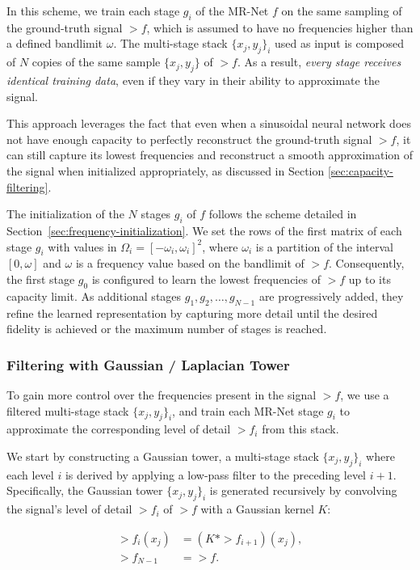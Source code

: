 In this scheme, we train each stage $g_i$ of the MR-Net $f$ on the same sampling of the ground-truth signal $\gt{f}$, which is assumed to have no frequencies higher than a defined bandlimit $\omega$. The multi-stage stack $\{x_j, y_j\}_i$ used as input is composed of $N$ copies of the same sample $\{x_j, y_j\}$ of $\gt{f}$. As a result, \textit{every stage receives identical training data}, even if they vary in their ability to approximate the signal.

This approach leverages the fact that even when a sinusoidal neural network does not have enough capacity to perfectly reconstruct the ground-truth signal $\gt{f}$, it can still capture its lowest frequencies and reconstruct a smooth approximation of the signal when initialized appropriately, as discussed in Section \ref{sec:capacity-filtering}. 

The initialization of the $N$ stages $g_i$ of $f$ follows the scheme detailed in Section~\ref{sec:frequency-initialization}. We set the rows of the first matrix of each stage $g_i$ with values in $\Omega_i=[-\omega_i, \omega_i]^2$, where $\omega_i$ is a partition of the interval $[0,\omega]$ and $\omega$ is a frequency value based on the bandlimit of $\gt{f}$. Consequently, the first stage $g_0$ is configured to learn the lowest frequencies of $\gt{f}$ up to its capacity limit. As additional stages $g_1, g_2, \ldots, g_{N-1}$ are progressively added, they refine the learned representation by capturing more detail until the desired fidelity is achieved or the maximum number of stages is reached.

\subsubsection{Filtering with Gaussian / Laplacian Tower}

To gain more control over the frequencies present in the signal $\gt{f}$, we use a filtered multi-stage stack $\{x_j, y_j\}_i$, and train each MR-Net stage $g_i$ to approximate the corresponding level of detail \( \gt{f}_i \) from this stack.

We start by constructing a Gaussian tower, a multi-stage stack $\{x_j, y_j\}_i$ where each level $i$ is derived by applying a low-pass filter to the preceding level $i+1$. Specifically, the Gaussian tower $\{x_j, y_j\}_i$ is generated recursively by convolving the signal's level of detail $\gt{f}_i$ of $\gt{f}$ with a Gaussian kernel $K$:

\begin{align*}
    \gt{f}_i(x_j) &= \left(K * \gt{f}_{i+1}\right)(x_j), \\
    \gt{f}_{N-1} &= \gt{f}.
\end{align*}


